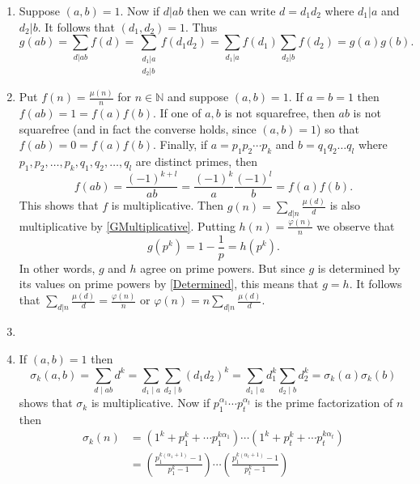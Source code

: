 \documentclass[12pt]{article}
\begin{document}
\begin{enumerate}
\item\label{GMultiplicative} %
Suppose $\left(a,b\right)=1$. Now if $d|ab$ then we can
write $d=d_1d_2$ where $d_1|a$ and $d_2|b$. It follows that
$\left(d_1,d_2\right)=1$. Thus
\[g\left(ab\right)=\sum_{d|ab}f\left(d\right)
=\sum_{\substack{d_1|a\\d_2|b}}f\left(d_1d_2\right)
=\sum_{d_1|a}f\left(d_1\right)\sum_{d_2|b}f\left(d_2\right)
=g\left(a\right)g\left(b\right).\]

\item\label{MuMultiplicative} %
Put $f\left(n\right)=\frac{\mu\left(n\right)}{n}$ for $n\in\mathbb{N}$
and suppose $\left(a,b\right)=1$.
If $a=b=1$ then $f\left(ab\right)=1=f\left(a\right)f\left(b\right)$.
If one of $a,b$ is not squarefree, then $ab$ is not squarefree
(and in fact the converse holds, since $\left(a,b\right)=1$)
so that $f\left(ab\right)=0=f\left(a\right)f\left(b\right)$.
Finally, if $a=p_1p_2\cdots p_k$ and $b=q_1q_2\ldots q_l$
where $p_1,p_2,\ldots,p_k,q_1,q_2,\ldots,q_l$ are distinct
primes, then
\[f\left(ab\right)=\frac{\left(-1\right)^{k+l}}{ab}
=\frac{\left(-1\right)^k}{a}\frac{\left(-1\right)^l}{b}
=f\left(a\right)f\left(b\right).\]
This shows that $f$ is multiplicative.
Then $g\left(n\right)=\sum_{d|n}
\frac{\mu\left(d\right)}{d}$ is also multiplicative
by \autoref{GMultiplicative}. 
Putting $h\left(n\right)=\frac{\varphi\left(n\right)}{n}$
we observe that
\[g\left(p^k\right)=1-\frac{1}{p}=h\left(p^k\right).\] 
In other words, $g$ and $h$ agree on prime powers.
But since $g$ is determined by its values
on prime powers by \autoref{Determined}, this means that $g=h$.
It follows that
$\sum_{d|n}\frac{\mu\left(d\right)}{d}
=\frac{\varphi\left(n\right)}{n}$
or $\varphi\left(n\right)
=n\sum_{d|n}\frac{\mu\left(d\right)}{d}$.

\item %
\item %
If $\left(a,b\right)=1$ then
\[\sigma_k\left(a,b\right)
=\sum_{d\mid ab}d^k=\sum_{d_1\mid a}\sum_{d_2\mid b}
\left(d_1d_2\right)^k
=\sum_{d_1\mid a}d_1^k\sum_{d_2\mid b}d_2^k
=\sigma_k\left(a\right)\sigma_k\left(b\right)\]
shows that $\sigma_k$ is multiplicative.
Now if $p_1^{\alpha_1}\cdots p_t^{\alpha_t}$
is the prime factorization of $n$ then
\begin{align*}
\sigma_k\left(n\right)
&=\left(1^k+p_1^k+\cdots p_1^{k\alpha_1}\right)
\cdots\left(1^k+p_t^k+\cdots p_t^{k\alpha_t}\right)\\
&=\left(\frac{p_1^{k\left(\alpha_1+1\right)}-1}{p_1^k-1}\right)
\cdots\left(\frac{p_1^{k\left(\alpha_t+1\right)}-1}{p_t^k-1}\right)
\end{align*}


\end{enumerate}
\end{document}
